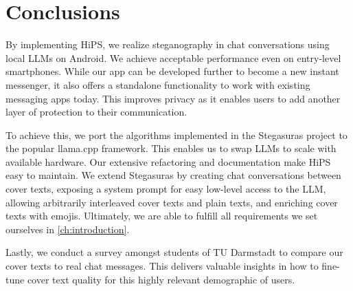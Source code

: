 
\chapter{Conclusions}\label{ch:conclusions}
\glsresetall %

By implementing \gls{HiPS}, we realize steganography in chat conversations using local \glspl{LLM} on Android. We achieve acceptable performance even on entry-level smartphones. While our app can be developed further to become a new instant messenger, it also offers a standalone functionality to work with existing messaging apps today. This improves privacy as it enables users to add another layer of protection to their communication.

To achieve this, we port the algorithms implemented in the Stegasuras project to the popular llama.cpp framework. This enables us to swap \glspl{LLM} to scale with available hardware. Our extensive refactoring and documentation make \gls{HiPS} easy to maintain. We extend Stegasuras by creating chat conversations between cover texts, exposing a system prompt for easy low-level access to the \gls{LLM}, allowing arbitrarily interleaved cover texts and plain texts, and enriching cover texts with emojis. Ultimately, we are able to fulfill all requirements we set ourselves in \cref{ch:introduction}.

Lastly, we conduct a survey amongst students of TU Darmstadt to compare our cover texts to real chat messages. This delivers valuable insights in how to fine-tune cover text quality for this highly relevant demographic of users.
